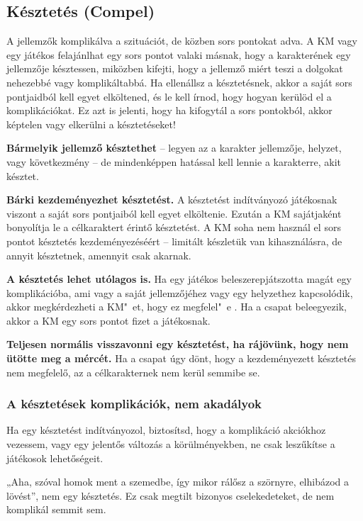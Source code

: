 \subsection[Késztetés]{Késztetés (Compel)}

A jellemzők  komplikálva a szituációt, de közben sors pontokat adva. A KM vagy egy játékos felajánlhat egy sors pontot valaki másnak, hogy a karakterének egy jellemzője késztessen, miközben kifejti, hogy a jellemző miért teszi a dolgokat nehezebbé vagy komplikáltabbá. Ha ellenállsz a késztetésnek, akkor a saját sors pontjaidból kell egyet elköltened, és le kell írnod, hogy hogyan kerülöd el a komplikációkat. Ez azt is jelenti, hogy ha kifogytál a sors pontokból, akkor képtelen vagy elkerülni a késztetéseket!

\textbf{Bármelyik jellemző késztethet} -- legyen az a karakter jellemzője, helyzet, vagy következmény -- de mindenképpen hatással kell lennie a karakterre, akit késztet.

\textbf{Bárki kezdeményezhet késztetést.} A késztetést indítványozó játékosnak viszont a saját sors pontjaiból kell egyet elköltenie. Ezután a KM sajátjaként bonyolítja le a célkaraktert érintő késztetést. A KM soha nem használ el sors pontot késztetés kezdeményezéséért -- limitált készletük van kihasználásra, de annyit késztetnek, amennyit csak akarnak.

\textbf{A késztetés lehet utólagos is.} Ha egy játékos beleszerepjátszotta magát egy komplikációba, ami vagy a saját jellemzőjéhez vagy egy helyzethez kapcsolódik, akkor megkérdezheti a KM"~et, hogy ez megfelel"~e . Ha a csapat beleegyezik, akkor a KM egy sors pontot fizet a játékosnak.

\textbf{Teljesen normális visszavonni egy késztetést, ha rájövünk, hogy nem ütötte meg a mércét.} Ha a csapat úgy dönt, hogy a kezdeményezett késztetés nem megfelelő, az a célkarakternek nem kerül semmibe se.

\subsubsection{A késztetések komplikációk, nem akadályok}

Ha egy késztetést indítványozol, biztosítsd, hogy a komplikáció akciókhoz vezessem, vagy egy jelentős változás a körülményekben, ne csak leszűkítse a játékosok lehetőségeit.

„Aha, szóval homok ment a szemedbe, így mikor rálősz a szörnyre, elhibázod a lövést”, nem egy késztetés. Ez csak megtilt bizonyos cselekedeteket, de nem komplikál semmit sem.

